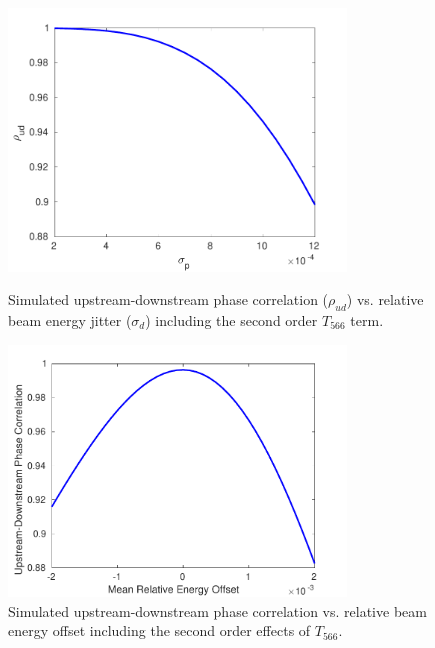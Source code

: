 \begin{figure}
  \centering
  \includegraphics[width=0.8\textwidth]{Figures/propagation/maxCorrWithT566}
  \caption{Simulated upstream-downstream phase correlation (\(\rho_{ud}\)) vs. relative beam energy jitter (\(\sigma_d\)) including the second order \(T_{566}\) term.}
  \label{f:maxCorrWithT566}
  \centering
  \includegraphics[width=0.8\textwidth]{Figures/propagation/corrVsEnergyOffset}
  \caption{Simulated upstream-downstream phase correlation vs. relative beam energy offset including the second order effects of \(T_{566}\).}
  \label{f:corrVsEnergyOffset}
\end{figure}

